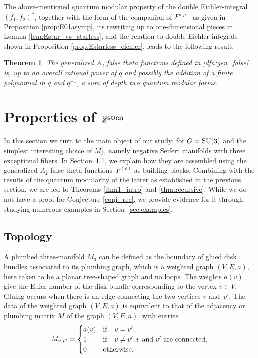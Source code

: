 \documentclass[pdftex]{sigma}
\def\bv{{\vec{\underline{b}}}}
\newtheorem{thm}{Theorem}[section]
\theoremstyle{definition}
\numberwithin{equation}{section}
\begin{document}
The above-mentioned quantum modular property of the double Eichler-integral $(f_1,f_2)^\ast$, together with the form of the companion of $F^{(\rho)}$ as given in Proposition \ref{prop:E01asymp}, its rewriting up to one-dimensional pieces in Lemma \ref{lem:Estar_vs_starless}, and the relation to double Eichler integrals shown in Proposition \ref{prop:Estarless_eichler}, leads to the following result.
\begin{thm}
 The generalized $A_2$ false theta functions defined in \eqref{dfn:gen_false} is, up to an overall rational power of $q$ and possibly the addition of a finite polynomial in $q$ and $q^{-1}$, a sum of depth two quantum modular forms.
\end{thm}

\section[Properties of Z\^{}\{SU(3)\}]{Properties of $\boldsymbol{\widehat{Z}^{{\rm SU}(3)}}$}\label{sec:Zhat}

In this section we turn to the main object of our study: \smash{$\widehat Z^{G}_\bv(M_3)$} for $G={\rm SU}(3)$ and the simplest interesting choice of $M_3$, namely negative Seifert manifolds with three exceptional fibers. In Section~\ref{subsec:topology}, we explain how they are assembled using the generalized $A_2$ false theta functions~$F^{(\rho)}$ as building blocks. Combining with the results of the quantum modularity of the latter as established in the previous section, we are led to Theorems \ref{thm1_intro} and \ref{thm:recursive}. While we do not have a proof for Conjecture \ref{conj_rec}, we provide evidence for it through studying numerous examples in Section~\ref{sec:examples}.




\subsection{Topology}
\label{subsec:topology}

A plumbed three-manifold $M_3$ can be defined
as the boundary of glued disk bundles
associated to its plumbing graph, which is a weighted graph $(V,E,a)$, here taken to be a planar tree-shaped graph and no loops. The weights $a(v)$ give the Euler number of the disk bundle corresponding to the vertex $v\in V$.
Gluing occurs when there is an edge connecting the two vertices $v$ and~$v' $.
 The data of the weighted graph $(V,E,a)$ is equivalent to that of the adjacency or plumbing matrix $M$ of the graph $(V,E,a)$, with entries
\begin{equation}\label{adjacencymatrix}
 M_{v,v' }=\begin{cases}
 a(v) & \mathrm{if}\quad v=v', \\
 1 & {\mathrm{if}}\quad v\neq v', v {\rm ~and~} v' {\rm ~are~connected}, \\
 0 & \mathrm{otherwise} .
 \end{cases}
\end{equation}
\end{document}
